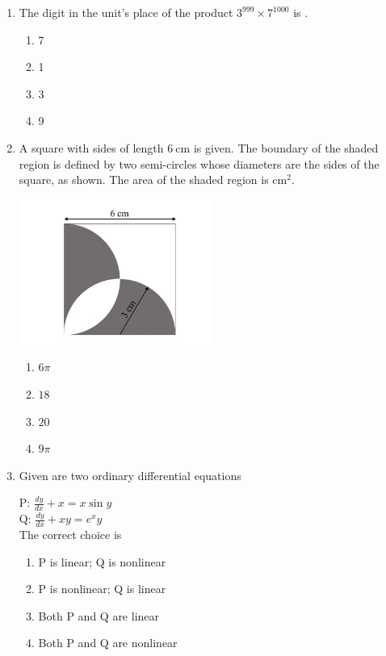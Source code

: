 \documentclass[journal,12pt,onecolumn]{IEEEtran}
\theoremstyle{remark}
\begin{document}
\begin{enumerate}
\newpage

\item The digit in the unit's place of the product $3^{999} \times 7^{1000}$ is \underline{\hspace{1cm}}. 

\begin{enumerate}
\item 7
\item 1
\item 3
\item 9
\end{enumerate}
\hfill{}
\item A square with sides of length $6 \ \text{cm}$ is given. The boundary of the shaded region is defined by two semi-circles whose diameters are the sides of the square, as shown. The area of the shaded region is \underline{\hspace{1cm}} $\text{cm}^2$. 

\begin{center}
\includegraphics[width=0.5\textwidth]{figs/img 3.jpeg}
\end{center}

\begin{enumerate}
\item $6\pi$
\item $18$
\item $20$
\item $9\pi$
\end{enumerate}
\hfill{}

\newpage

\item Given are two ordinary differential equations 

P: $\frac{dy}{dx} + x = x \sin y$ \\
Q: $\frac{dy}{dx} + x y = e^{x} y$ \\

The correct choice is

\begin{enumerate}
\item P is linear; Q is nonlinear
\item P is nonlinear; Q is linear
\item Both P and Q are linear
\item Both P and Q are nonlinear
\end{enumerate}
\hfill{}


\end{enumerate}
\end{document}
